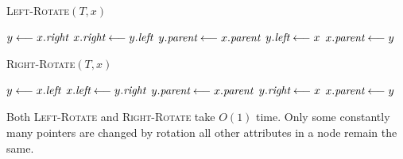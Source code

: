 \begin{minipage}{0.46\textwidth}
	\begin{algorithm}[H]
		\caption{\textsc{Left-Rotate}$({T,x})$}
		\DontPrintSemicolon
		$y\longleftarrow x.\emph{right}$\;
		$x.\emph{right}\longleftarrow y.\emph{left}$\;
		$y.\emph{parent}\longleftarrow x.\emph{parent}$\;
		$y.\emph{left}\longleftarrow x$\;
		$x.\emph{parent}\longleftarrow y$
	\end{algorithm}
\end{minipage}\hfill
\begin{minipage}{0.46\textwidth}
	\begin{algorithm}[H]
		\caption{\textsc{Right-Rotate}$({T,x})$}
		\DontPrintSemicolon
		$y\longleftarrow x.\emph{left}$\;
		$x.\emph{left}\longleftarrow y.\emph{right}$\;
		$y.\emph{parent}\longleftarrow x.\emph{parent}$\;
		$y.\emph{right}\longleftarrow x$\;
		$x.\emph{parent}\longleftarrow y$
	\end{algorithm}
\end{minipage}\parinn

Both \textsc{Left-Rotate} and \textsc{Right-Rotate} take $O(1)$ time. Only some constantly many pointers are changed by rotation all other attributes in a node remain the same.
